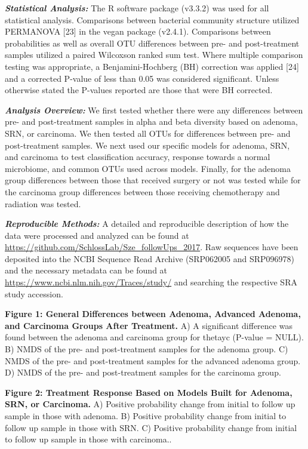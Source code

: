 \documentclass[12pt,]{article}
\begin{document}
\textbf{\emph{Statistical Analysis:}} The R software package (v3.3.2)
was used for all statistical analysis. Comparisons between bacterial
community structure utilized PERMANOVA {[}23{]} in the vegan package
(v2.4.1). Comparisons between probabilities as well as overall OTU
differences between pre- and post-treatment samples utilized a paired
Wilcoxson ranked sum test. Where multiple comparison testing was
appropriate, a Benjamini-Hochberg (BH) correction was applied {[}24{]}
and a corrected P-value of less than 0.05 was considered significant.
Unless otherwise stated the P-values reported are those that were BH
corrected.

\textbf{\emph{Analysis Overview:}} We first tested whether there were
any differences between pre- and post-treatment samples in alpha and
beta diversity based on adenoma, SRN, or carcinoma. We then tested all
OTUs for differences between pre- and post-treatment samples. We next
used our specific models for adenoma, SRN, and carcinoma to test
classification accuracy, response towards a normal microbiome, and
common OTUs used across models. Finally, for the adenoma group
differences between those that received surgery or not was tested while
for the carcinoma group differences between those receiving chemotherapy
and radiation was tested.

\textbf{\emph{Reproducible Methods:}} A detailed and reproducible
description of how the data were processed and analyzed can be found at
\url{https://github.com/SchlossLab/Sze_followUps_2017}. Raw sequences
have been deposited into the NCBI Sequence Read Archive (SRP062005 and
SRP096978) and the necessary metadata can be found at
\url{https://www.ncbi.nlm.nih.gov/Traces/study/} and searching the
respective SRA study accession.

\newpage

\textbf{Figure 1: General Differences between Adenoma, Advanced Adenoma,
and Carcinoma Groups After Treatment.} A) A significant difference was
found between the adenoma and carcinoma group for thetayc (P-value =
NULL). B) NMDS of the pre- and post-treatment samples for the adenoma
group. C) NMDS of the pre- and post-treatment samples for the advanced
adenoma group. D) NMDS of the pre- and post-treatment samples for the
carcinoma group.

\textbf{Figure 2: Treatment Response Based on Models Built for Adenoma,
SRN, or Carcinoma.} A) Positive probability change from initial to
follow up sample in those with adenoma. B) Positive probability change
from initial to follow up sample in those with SRN. C) Positive
probability change from initial to follow up sample in those with
carcinoma..
\end{document}
